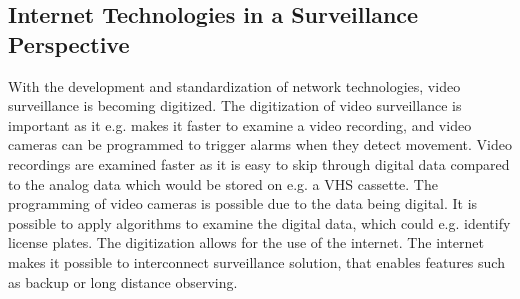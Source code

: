 \subsection{Internet Technologies in a Surveillance Perspective}
With the development and standardization of network technologies, video surveillance is becoming digitized.
The digitization of video surveillance is important as it e.g. makes it faster to examine a video recording, and video cameras can be programmed to trigger alarms when they detect movement.
Video recordings are examined faster as it is easy to skip through digital data compared to the analog data which would be stored on e.g. a VHS cassette.
The programming of video cameras is possible due to the data being digital. 
It is possible to apply algorithms to examine the digital data, which could e.g. identify license plates.
The digitization allows for the use of the internet.
The internet makes it possible to interconnect surveillance solution, that enables features such as backup or long distance observing.














